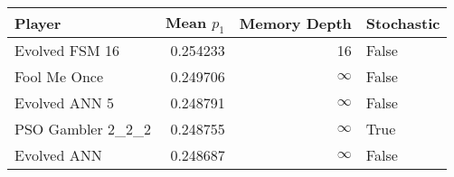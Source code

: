 \begin{tabular}{lrrl}
\toprule
            Player &  Mean $p_1$ &  Memory Depth & Stochastic \\
\midrule
    Evolved FSM 16 &    0.254233 &            16 &      False \\
      Fool Me Once &    0.249706 &            \(\infty\) &      False \\
     Evolved ANN 5 &    0.248791 &            \(\infty\) &      False \\
 PSO Gambler 2\_2\_2 &    0.248755 &            \(\infty\) &       True \\
       Evolved ANN &    0.248687 &            \(\infty\) &      False \\
\bottomrule
\end{tabular}
